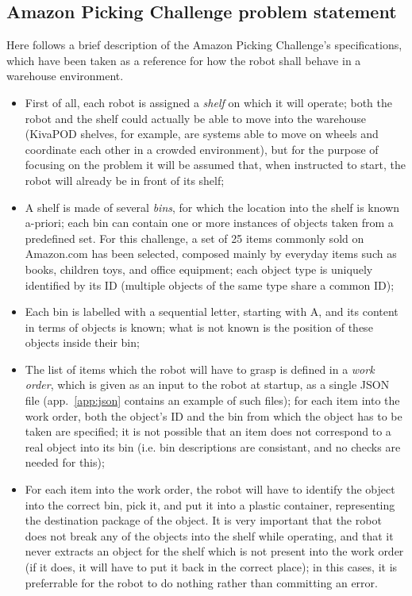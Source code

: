 \subsection{Amazon Picking Challenge problem statement} \label{sec:apc}
Here follows a brief description of the Amazon Picking Challenge's
specifications, which have been taken as a reference for how the robot
shall behave in a warehouse environment.

\begin{itemize}

\item{First of all, each robot is assigned a \emph{shelf} on which it will
operate; both the robot and the shelf could actually be able to move
into the warehouse (KivaPOD shelves, for example, are systems able to
move on wheels and coordinate each other in a crowded environment),
but for the purpose of focusing on the problem it will be assumed
that, when instructed to start, the robot will already be in front of
its shelf;}
\item{A shelf is made of several \emph{bins}, for which the location
into the shelf is known a-priori; each bin can contain one or more
instances of objects taken from a predefined set. For this challenge,
a set of 25 items commonly sold on Amazon.com has been selected,
composed mainly by everyday items such as books, children toys, and
office equipment; each object type is uniquely identified by its ID
(multiple objects of the same type share a common ID);}
\item{Each bin is labelled with a sequential letter, starting with A,
and its content in terms of objects is known; what is not known is the
position of these objects inside their bin;}
\item{The list of items which the robot will have to grasp is defined
in a \emph{work order}, which is given as an input to the robot at
startup, as a single JSON file (app.~\ref{app:json} contains an
example of such files); for each item into the work order, both the object's ID and
the bin from which the object has to be taken are specified; it is not
possible that an item does not correspond to a real object into its
bin (i.e. bin descriptions are consistant, and no checks are needed
for this);}
\item{For each item into the work order, the robot will have to
identify the object into the correct bin, pick it, and put it into a
plastic container, representing the destination package of the
object. It is very important that the robot does not break any of the
objects into the shelf while operating, and that it never extracts an
object for the shelf which is not present into the work order (if it
does, it will have to put it back in the correct place); in this
cases, it is preferrable for the robot to do nothing rather than
committing an error.}
\end{itemize}

